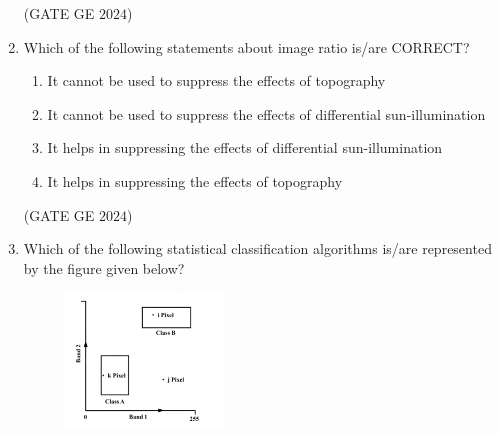 \documentclass[journal,12pt,onecolumn]{IEEEtran}
\theoremstyle{remark}
\begin{document}
\begin{enumerate}
\begin{center}
\begin{tabular}{cc}
\end{tabular}
\end{center}
\begin{enumerate}
\end{enumerate}
\hfill{(GATE GE $2024$)}
\bigskip
\item Which of the following statements about image ratio is/are CORRECT?
\begin{enumerate}
\item It cannot be used to suppress the effects of topography
\item It cannot be used to suppress the effects of differential sun-illumination
\item It helps in suppressing the effects of differential sun-illumination
\item It helps in suppressing the effects of topography
\end{enumerate}
\hfill{(GATE GE $2024$)}
\bigskip
\item Which of the following statistical classification algorithms is/are represented by the figure given below?
\\
\begin{figure}[h!]
    \centering
    \includegraphics[width=0.4\textwidth]{figs/fig11.png}
\end{figure}


\end{enumerate}
\end{document}
